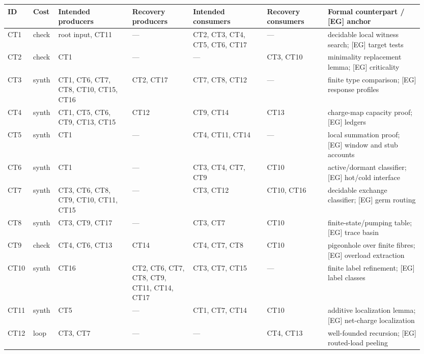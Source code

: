 \documentclass[
  11pt,
]{article}
\theoremstyle{definition}
\begin{document}
\begingroup
\tiny
\setlength{\tabcolsep}{0.7pt}
\begin{longtable}[]{@{}
  >{\raggedright\arraybackslash}p{0.055\linewidth}
  >{\raggedright\arraybackslash}p{0.055\linewidth}
  >{\raggedright\arraybackslash}p{0.17\linewidth}
  >{\raggedright\arraybackslash}p{0.14\linewidth}
  >{\raggedright\arraybackslash}p{0.17\linewidth}
  >{\raggedright\arraybackslash}p{0.14\linewidth}
  >{\raggedright\arraybackslash}p{0.22\linewidth}@{}}
\toprule\noalign{}
ID & Cost & Intended producers & Recovery producers & Intended consumers & Recovery consumers & Formal counterpart / [EG] anchor \\
\midrule\noalign{}
\endhead
\bottomrule\noalign{}
\endlastfoot
CT1 & check & root input, CT11 & --- & CT2, CT3, CT4, CT5, CT6, CT17 & --- & decidable local witness search; [EG] target tests \\
CT2 & check & CT1 & --- & --- & CT3, CT10 & minimality replacement lemma; [EG] criticality \\
CT3 & synth & CT1, CT6, CT7, CT8, CT10, CT15, CT16 & CT2, CT17 & CT7, CT8, CT12 & --- & finite type comparison; [EG] response profiles \\
CT4 & synth & CT1, CT5, CT6, CT9, CT13, CT15 & CT12 & CT9, CT14 & CT13 & charge-map capacity proof; [EG] ledgers \\
CT5 & synth & CT1 & --- & CT4, CT11, CT14 & --- & local summation proof; [EG] window and stub accounts \\
CT6 & synth & CT1 & --- & CT3, CT4, CT7, CT9 & CT10 & active/dormant classifier; [EG] hot/cold interface \\
CT7 & synth & CT3, CT6, CT8, CT9, CT10, CT11, CT15 & --- & CT3, CT12 & CT10, CT16 & decidable exchange classifier; [EG] germ routing \\
CT8 & synth & CT3, CT9, CT17 & --- & CT3, CT7 & CT10 & finite-state/pumping table; [EG] trace basin \\
CT9 & check & CT4, CT6, CT13 & CT14 & CT4, CT7, CT8 & CT10 & pigeonhole over finite fibres; [EG] overload extraction \\
CT10 & synth & CT16 & CT2, CT6, CT7, CT8, CT9, CT11, CT14, CT17 & CT3, CT7, CT15 & --- & finite label refinement; [EG] label classes \\
CT11 & synth & CT5 & --- & CT1, CT7, CT14 & CT10 & additive localization lemma; [EG] net-charge localization \\
CT12 & loop & CT3, CT7 & --- & --- & CT4, CT13 & well-founded recursion; [EG] routed-load peeling \\

\end{longtable}
\end{document}
